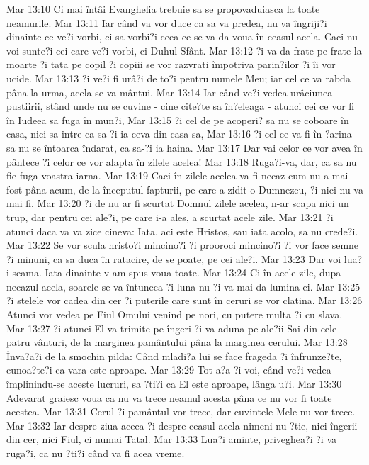 Mar 13:10  Ci mai întâi Evanghelia trebuie sa se propovaduiasca la toate neamurile.
Mar 13:11  Iar când va vor duce ca sa va predea, nu va îngriji?i dinainte ce ve?i vorbi, ci sa vorbi?i ceea ce se va da voua în ceasul acela. Caci nu voi sunte?i cei care ve?i vorbi, ci Duhul Sfânt.
Mar 13:12  ?i va da frate pe frate la moarte ?i tata pe copil ?i copiii se vor razvrati împotriva parin?ilor ?i îi vor ucide.
Mar 13:13  ?i ve?i fi urâ?i de to?i pentru numele Meu; iar cel ce va rabda pâna la urma, acela se va mântui.
Mar 13:14  Iar când ve?i vedea urâciunea pustiirii, stând unde nu se cuvine - cine cite?te sa în?eleaga - atunci cei ce vor fi în Iudeea sa fuga în mun?i,
Mar 13:15  ?i cel de pe acoperi? sa nu se coboare în casa, nici sa intre ca sa-?i ia ceva din casa sa,
Mar 13:16  ?i cel ce va fi în ?arina sa nu se întoarca îndarat, ca sa-?i ia haina.
Mar 13:17  Dar vai celor ce vor avea în pântece ?i celor ce vor alapta în zilele acelea!
Mar 13:18  Ruga?i-va, dar, ca sa nu fie fuga voastra iarna.
Mar 13:19  Caci în zilele acelea va fi necaz cum nu a mai fost pâna acum, de la începutul fapturii, pe care a zidit-o Dumnezeu, ?i nici nu va mai fi.
Mar 13:20  ?i de nu ar fi scurtat Domnul zilele acelea, n-ar scapa nici un trup, dar pentru cei ale?i, pe care i-a ales, a scurtat acele zile.
Mar 13:21  ?i atunci daca va va zice cineva: Iata, aci este Hristos, sau iata acolo, sa nu crede?i.
Mar 13:22  Se vor scula hristo?i mincino?i ?i prooroci mincino?i ?i vor face semne ?i minuni, ca sa duca în ratacire, de se poate, pe cei ale?i.
Mar 13:23  Dar voi lua?i seama. Iata dinainte v-am spus voua toate.
Mar 13:24  Ci în acele zile, dupa necazul acela, soarele se va întuneca ?i luna nu-?i va mai da lumina ei.
Mar 13:25  ?i stelele vor cadea din cer ?i puterile care sunt în ceruri se vor clatina.
Mar 13:26  Atunci vor vedea pe Fiul Omului venind pe nori, cu putere multa ?i cu slava.
Mar 13:27  ?i atunci El va trimite pe îngeri ?i va aduna pe ale?ii Sai din cele patru vânturi, de la marginea pamântului pâna la marginea cerului.
Mar 13:28  Înva?a?i de la smochin pilda: Când mladi?a lui se face frageda ?i înfrunze?te, cunoa?te?i ca vara este aproape.
Mar 13:29  Tot a?a ?i voi, când ve?i vedea împlinindu-se aceste lucruri, sa ?ti?i ca El este aproape, lânga u?i.
Mar 13:30  Adevarat graiesc voua ca nu va trece neamul acesta pâna ce nu vor fi toate acestea.
Mar 13:31  Cerul ?i pamântul vor trece, dar cuvintele Mele nu vor trece.
Mar 13:32  Iar despre ziua aceea ?i despre ceasul acela nimeni nu ?tie, nici îngerii din cer, nici Fiul, ci numai Tatal.
Mar 13:33  Lua?i aminte, priveghea?i ?i va ruga?i, ca nu ?ti?i când va fi acea vreme.
